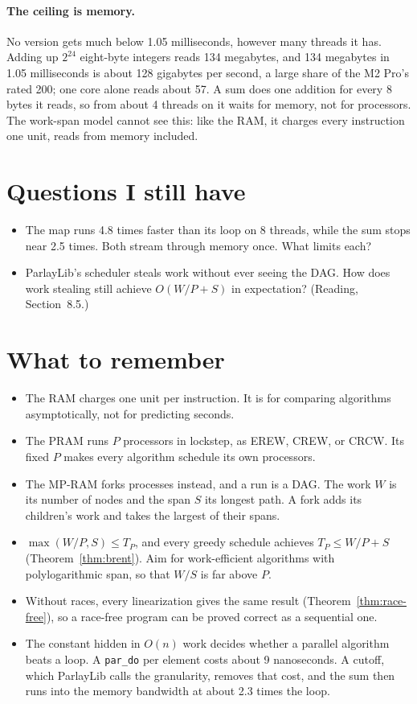 \paragraph{The ceiling is memory.} No version gets much below 1.05 milliseconds, however many threads it has. Adding up $2^{24}$ eight-byte integers reads 134 megabytes, and 134 megabytes in 1.05 milliseconds is about 128 gigabytes per second, a large share of the M2 Pro's rated 200; one core alone reads about 57. A sum does one addition for every 8 bytes it reads, so from about 4 threads on it waits for memory, not for processors. The work-span model cannot see this: like the RAM, it charges every instruction one unit, reads from memory included.

\section{Questions I still have}

\begin{itemize}
  \item The map runs 4.8 times faster than its loop on 8 threads, while the sum stops near 2.5 times. Both stream through memory once. What limits each?
  \item ParlayLib's scheduler steals work without ever seeing the DAG. How does work stealing still achieve $O(W/P + S)$ in expectation? (Reading, Section~8.5.)
\end{itemize}

\section{What to remember}

\begin{itemize}
  \item The RAM charges one unit per instruction. It is for comparing algorithms asymptotically, not for predicting seconds.
  \item The PRAM runs $P$ processors in lockstep, as EREW, CREW, or CRCW. Its fixed $P$ makes every algorithm schedule its own processors.
  \item The MP-RAM forks processes instead, and a run is a DAG. The work $W$ is its number of nodes and the span $S$ its longest path. A fork adds its children's work and takes the largest of their spans.
  \item $\max(W/P, S) \le T_P$, and every greedy schedule achieves $T_P \le W/P + S$ (Theorem~\ref{thm:brent}). Aim for work-efficient algorithms with polylogarithmic span, so that $W/S$ is far above $P$.
  \item Without races, every linearization gives the same result (Theorem~\ref{thm:race-free}), so a race-free program can be proved correct as a sequential one.
  \item The constant hidden in $O(n)$ work decides whether a parallel algorithm beats a loop. A \texttt{par\_do} per element costs about 9 nanoseconds. A cutoff, which ParlayLib calls the granularity, removes that cost, and the sum then runs into the memory bandwidth at about 2.3 times the loop.
\end{itemize}
